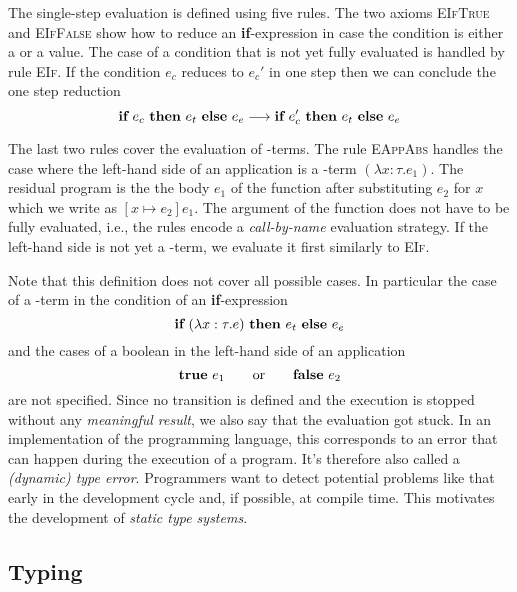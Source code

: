 {The single-step evaluation is defined using five rules. The two axioms
\textsc{EIfTrue} and \textsc{EIfFalse} show how to reduce an
\textbf{if}-expression in case the condition is either a \true or a \false
value. The case of a condition that is not yet fully evaluated is handled by
rule \textsc{EIf}. If the condition $e_c$ reduces to $e_c'$ in one step then we
can conclude the one step reduction
\[ {\textbf{if}~{e_c}~\textbf{then}~{e_t}~\textbf{else}~{e_e}} \longrightarrow {\textbf{if}~{e_c'}~\textbf{then}~{e_t}~\textbf{else}~{e_e}} \]

The last two rules cover the evaluation of \textlambda-terms. The rule
\textsc{EAppAbs} handles the case where the left-hand side of an application is
a \textlambda-term $(\lambda x:\tau.e_1)$. The residual program is the the body
$e_1$ of the function after substituting $e_2$ for $x$ which we write as
$[x \mapsto e_2]e_1$. The argument of the function does not have to be fully
evaluated, i.e., the rules encode a \emph{call-by-name} evaluation strategy. If
the left-hand side is not yet a \textlambda-term, we evaluate it first similarly
to \textsc{EIf}.

Note that this definition does not cover all possible cases. In particular the
case of a \textlambda-term in the condition of an \textbf{if}-expression
\[ \textbf{if}~{(\lambda x:\tau.e)}~\textbf{then}~{e_t}~\textbf{else}~{e_e} \]
\noindent and the cases of a boolean in the left-hand side of an application
\[ \textbf{true}~e_1 \qquad \text{or} \qquad \textbf{false}~e_2 \]
\noindent are not specified. Since no transition is defined and the execution is
stopped without any \emph{meaningful result}, we also say that the evaluation
got stuck. In an implementation of the programming language, this corresponds to
an error that can happen during the execution of a program. It's therefore also
called a \emph{(dynamic) type error}. Programmers want to detect potential
problems like that early in the development cycle and, if possible, at compile
time. This motivates the development of \emph{static type systems}.

\subsection{Typing}\label{ssec:intro:typing}

}
